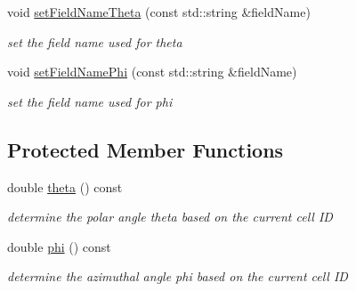 \begin{DoxyCompactItemize}
void \hyperlink{class_d_d4hep_1_1_d_d_segmentation_1_1_projective_cylinder_a90249eda202e3bd1fb2c5d8c193549af}{set\+Field\+Name\+Theta} (const std\+::string \&field\+Name)
\begin{DoxyCompactList}\small\item\em set the field name used for theta \end{DoxyCompactList}\item 
void \hyperlink{class_d_d4hep_1_1_d_d_segmentation_1_1_projective_cylinder_ad43fb9ac8d2eb280bdeb465f46f49c28}{set\+Field\+Name\+Phi} (const std\+::string \&field\+Name)
\begin{DoxyCompactList}\small\item\em set the field name used for phi \end{DoxyCompactList}\end{DoxyCompactItemize}
\subsection*{Protected Member Functions}
\begin{DoxyCompactItemize}
\item 
double \hyperlink{class_d_d4hep_1_1_d_d_segmentation_1_1_projective_cylinder_ad48181a5429e2c54a8a8ee23b17e3ac5}{theta} () const
\begin{DoxyCompactList}\small\item\em determine the polar angle theta based on the current cell ID \end{DoxyCompactList}\item 
double \hyperlink{class_d_d4hep_1_1_d_d_segmentation_1_1_projective_cylinder_a9da59e50c00faa415c44fca9f97faee5}{phi} () const
\begin{DoxyCompactList}\small\item\em determine the azimuthal angle phi based on the current cell ID \end{DoxyCompactList}\end{DoxyCompactItemize}
